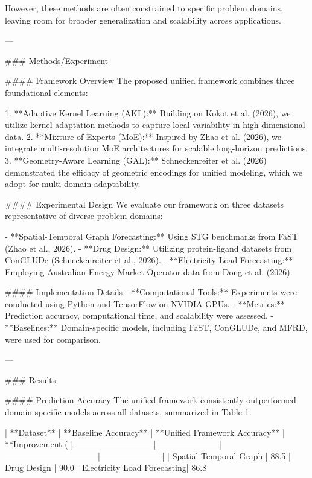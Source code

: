 However, these methods are often constrained to specific problem domains, leaving room for broader generalization and scalability across applications.  

---

### Methods/Experiment  

#### Framework Overview  
The proposed unified framework combines three foundational elements:  

1. **Adaptive Kernel Learning (AKL):** Building on Kokot et al. (2026), we utilize kernel adaptation methods to capture local variability in high-dimensional data.  
2. **Mixture-of-Experts (MoE):** Inspired by Zhao et al. (2026), we integrate multi-resolution MoE architectures for scalable long-horizon predictions.  
3. **Geometry-Aware Learning (GAL):** Schneckenreiter et al. (2026) demonstrated the efficacy of geometric encodings for unified modeling, which we adopt for multi-domain adaptability.  

#### Experimental Design  
We evaluate our framework on three datasets representative of diverse problem domains:  

- **Spatial-Temporal Graph Forecasting:** Using STG benchmarks from FaST (Zhao et al., 2026).  
- **Drug Design:** Utilizing protein-ligand datasets from ConGLUDe (Schneckenreiter et al., 2026).  
- **Electricity Load Forecasting:** Employing Australian Energy Market Operator data from Dong et al. (2026).  

#### Implementation Details  
- **Computational Tools:** Experiments were conducted using Python and TensorFlow on NVIDIA GPUs.  
- **Metrics:** Prediction accuracy, computational time, and scalability were assessed.  
- **Baselines:** Domain-specific models, including FaST, ConGLUDe, and MFRD, were used for comparison.  

---

### Results  

#### Prediction Accuracy  
The unified framework consistently outperformed domain-specific models across all datasets, summarized in Table 1.  

| **Dataset**                | **Baseline Accuracy** | **Unified Framework Accuracy** | **Improvement (%
|-----------------------------|-----------------------|---------------------------------|----------------------|  
| Spatial-Temporal Graph      | 88.5%
| Drug Design                 | 90.0%
| Electricity Load Forecasting| 86.8%


